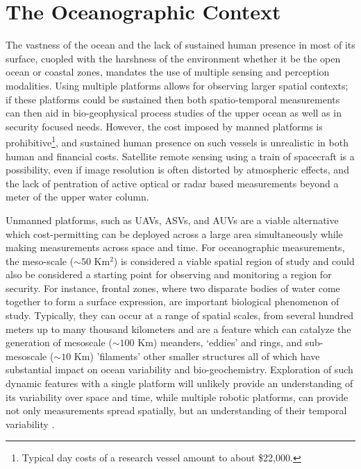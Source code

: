 \section{The Oceanographic Context}
\label{sec:context}

The vastness of the ocean and the lack of sustained human presence in
most of its surface, cuopled with the harshness of the environment
whether it be the open ocean or coastal zones, mandates the use of
multiple sensing and perception modalities. Using multiple platforms
allows for observing larger spatial contexts; if these platforms could
be sustained then both spatio-temporal measurements can then aid in
bio-geophysical process studies of the upper ocean as well as in
security focused needs. However, the cost imposed by manned platforms
is prohibitive\footnote{Typical day costs of a research vessel amount
  to about \$22,000.}, and sustained human presence on such vessels is
unrealistic in both human and financial costs. Satellite remote
sensing using a train of spacecraft is a possibility, even if image
resolution is often distorted by atmospheric effects, and the lack of
pentration of active optical or radar based measurements beyond a
meter of the upper water column. 

Unmanned platforms, such as UAVs, ASVs, and AUVs are a viable
alternative which cost-permitting can be deployed across a large area
simultaneously while making measurements across space and time. For
oceanographic measurements, the meso-scale ($\sim 50$ Km$^2$) is
considered a viable spatial region of study and could also be
considered a starting point for observing and monitoring a region for
security. For instance, frontal zones, where two disparate bodies of
water come together to form a surface expression, are important
biological phenomenon of study. Typically, they can occur at a range
of spatial scales, from several hundred meters up to many thousand
kilometers \cite{belkin2007fronts} and are a feature which can
catalyze the generation of mesoscale ($\sim 100$ Km) meanders,
‘eddies’ and rings, and sub-mesoscale ($\sim 10$ Km) 'filaments' other
smaller structures all of which have substantial impact on ocean
variability and bio-geochemistry. Exploration of such dynamic features
with a single platform will unlikely provide an understanding of its
variability over space and time, while multiple robotic platforms, can
provide not only measurements spread spatially, but an understanding
of their temporal variability \cite{pinto20,pinto22}.

